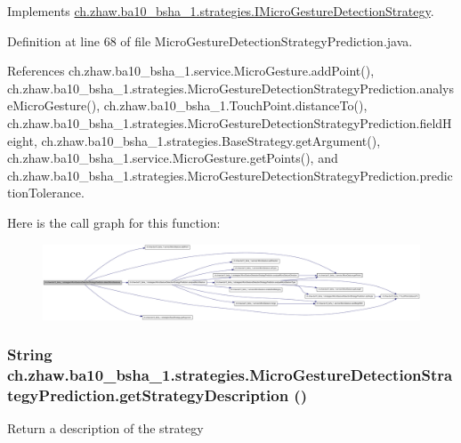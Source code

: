 Implements \hyperlink{interfacech_1_1zhaw_1_1ba10__bsha__1_1_1strategies_1_1IMicroGestureDetectionStrategy_a8593331fb67e5d4dc890d3db9f2d1b58}{ch.zhaw.ba10\_\-bsha\_\-1.strategies.IMicroGestureDetectionStrategy}.

Definition at line 68 of file MicroGestureDetectionStrategyPrediction.java.

References ch.zhaw.ba10\_\-bsha\_\-1.service.MicroGesture.addPoint(), ch.zhaw.ba10\_\-bsha\_\-1.strategies.MicroGestureDetectionStrategyPrediction.analyseMicroGesture(), ch.zhaw.ba10\_\-bsha\_\-1.TouchPoint.distanceTo(), ch.zhaw.ba10\_\-bsha\_\-1.strategies.MicroGestureDetectionStrategyPrediction.fieldHeight, ch.zhaw.ba10\_\-bsha\_\-1.strategies.BaseStrategy.getArgument(), ch.zhaw.ba10\_\-bsha\_\-1.service.MicroGesture.getPoints(), and ch.zhaw.ba10\_\-bsha\_\-1.strategies.MicroGestureDetectionStrategyPrediction.predictionTolerance.

Here is the call graph for this function:\nopagebreak
\begin{figure}[H]
\begin{center}
\leavevmode
\includegraphics[width=420pt]{classch_1_1zhaw_1_1ba10__bsha__1_1_1strategies_1_1MicroGestureDetectionStrategyPrediction_af8639be36ae7218b7f7d2feee8edc86f_cgraph}
\end{center}
\end{figure}
\hypertarget{classch_1_1zhaw_1_1ba10__bsha__1_1_1strategies_1_1MicroGestureDetectionStrategyPrediction_af62bea565c797e4313d5150b7d6335ca}{
\subsubsection[{getStrategyDescription}]{\setlength{\rightskip}{0pt plus 5cm}String ch.zhaw.ba10\_\-bsha\_\-1.strategies.MicroGestureDetectionStrategyPrediction.getStrategyDescription ()}}
\label{classch_1_1zhaw_1_1ba10__bsha__1_1_1strategies_1_1MicroGestureDetectionStrategyPrediction_af62bea565c797e4313d5150b7d6335ca}
Return a description of the strategy


